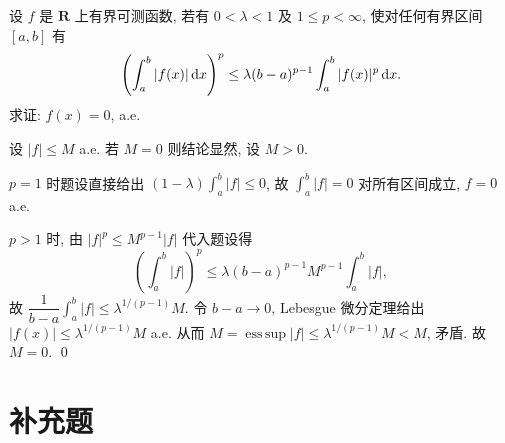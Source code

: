 \documentclass{article}
\begin{document}
设 $f$ 是 $\mathbf{R}$ 上有界可测函数, 若有 $0 < \lambda < 1$ 及 $1 \le p < \infty$, 使对任何有界区间 $[a,b]$ 有
\[
  \left(\int_a^b |f(x)|\,\mathrm{d} x\right)^p
  \le \lambda (b-a)^{p-1}\int_a^b |f(x)|^p\,\mathrm{d} x.
\]
求证: $f(x) = 0$, a.e.

\begin{solution}
  设 $|f|\le M$ a.e. 若 $M=0$ 则结论显然, 设 $M>0$.

  $p=1$ 时题设直接给出 $(1-\lambda)\int_a^b|f|\le 0$, 故 $\int_a^b|f|=0$ 对所有区间成立, $f=0$ a.e.

  $p>1$ 时, 由 $|f|^p\le M^{p-1}|f|$ 代入题设得
  \[
    \left(\int_a^b|f|\right)^p \le \lambda(b-a)^{p-1}M^{p-1}\int_a^b|f|,
  \]
  故 $\dfrac{1}{b-a}\displaystyle\int_a^b|f|\le \lambda^{1/(p-1)}M$.
  令 $b-a\to 0$, Lebesgue 微分定理给出 $|f(x)|\le\lambda^{1/(p-1)}M$ a.e.
  从而 $M=\operatorname{ess\,sup}|f|\le\lambda^{1/(p-1)}M<M$, 矛盾. 故 $M=0$. \qed
\end{solution}

\section{补充题}
\end{document}
